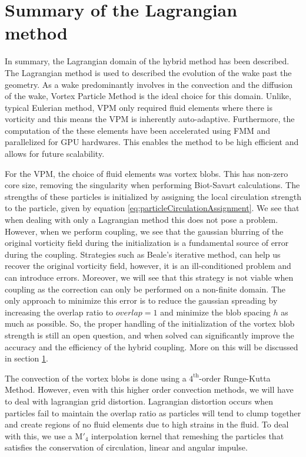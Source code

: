 \section{Summary of the Lagrangian method}

In summary, the Lagrangian domain of the hybrid method has been described. The Lagrangian method is used to described the evolution of the wake past the geometry. As a wake predominantly involves in the convection and the diffusion of the wake, Vortex Particle Method is the ideal choice for this domain. Unlike, typical Eulerian method, VPM only required fluid elements where there is vorticity and this means the VPM is inherently auto-adaptive. Furthermore, the computation of the these elements have been accelerated using FMM and parallelized for GPU hardwares. This enables the method to be high efficient and allows for future scalability.

For the VPM, the choice of fluid elements was vortex blobs. This has non-zero core size, removing the singularity when performing Biot-Savart calculations. The strengths of these particles is initialized by assigning the local circulation strength to the particle, given by equation \ref{eq:particleCirculationAssignment}. We see that when dealing with only a Lagrangian method this does not pose a problem. However, when we perform coupling, we see that the gaussian blurring of the original vorticity field during the initialization is a fundamental source of error during the coupling. Strategies such as Beale's iterative method, can help us recover the original vorticity field, however, it is an ill-conditioned problem and can introduce errors. Moreover, we will see that this strategy is not viable when coupling as the correction can only be performed on a non-finite domain. The only approach to minimize this error is to reduce the gaussian spreading by increasing the overlap ratio to $overlap=1$ and minimize the blob spacing $h$ as much as possible. So, the proper handling of the initialization of the vortex blob strength is still an open question, and when solved can significantly improve the accuracy and the efficiency of the hybrid coupling. More on this will be discussed in section \ref{}. 

The convection of the vortex blobs is done using a $4^{\mathrm{th}}$-order Runge-Kutta Method. However, even with this higher order convection methods, we will have to deal with lagrangian grid distortion. Lagrangian distortion occurs when particles fail to maintain the overlap ratio as particles will tend to clump together and create regions of no fluid elements due to high strains in the fluid. To deal with this, we use a $\mathrm{M}'_4$ interpolation kernel that remeshing the particles that satisfies the conservation of circulation, linear and angular impulse. 

